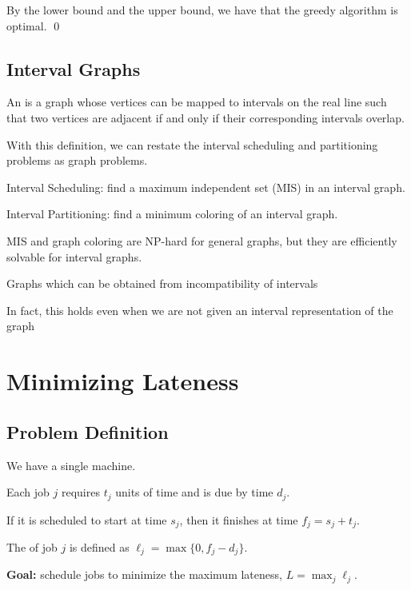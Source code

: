 By the lower bound and the upper bound, we have that the greedy algorithm is optimal. \qed

\subsection{Interval Graphs}

\begin{definition}
    An  is a graph whose vertices can be mapped to intervals on the real line such that two vertices are adjacent if and only if their corresponding intervals overlap.
\end{definition}

With this definition, we can restate the interval scheduling and partitioning problems as graph problems.
\begin{listu}
    \item Interval Scheduling: find a maximum independent set (MIS) in an interval graph.
    \item Interval Partitioning: find a minimum coloring of an interval graph.
\end{listu}

MIS and graph coloring are NP-hard for general graphs, but they are efficiently solvable for interval graphs.
\begin{listu}
    \item Graphs which can be obtained from incompatibility of intervals
    \item In fact, this holds even when we are not given an interval representation of the graph
\end{listu}

\section{Minimizing Lateness}

\subsection{Problem Definition}

\begin{listu}
    \item We have a single machine.
    \item Each job $j$ requires $t_j$ units of time and is due by time $d_j$.
    \item If it is scheduled to start at time $s_j$, then it finishes at time $f_j = s_j + t_j$.
    \item The  of job $j$ is defined as $\ell_j = \max\{0, f_j - d_j\}$.
    \item \textbf{Goal:} schedule jobs to minimize the maximum lateness, $L = \max_j \ell_j$.
\end{listu}

